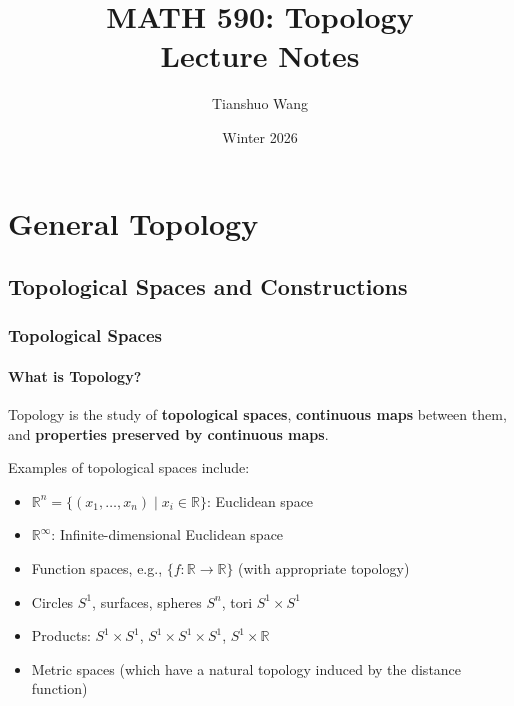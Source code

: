 \documentclass[11pt]{report}
\title{\textbf{MATH 590: Topology} \\ \large Lecture Notes}
\author{Tianshuo Wang}
\date{Winter 2026}
\begin{document}
\maketitle

\begin{center}
\end{center}

\tableofcontents
\newpage

\part{General Topology}

\chapter{Topological Spaces and Constructions}

\section{Topological Spaces}

\subsection{What is Topology?}

Topology is the study of \textbf{topological spaces}, \textbf{continuous maps} between them, and \textbf{properties preserved by continuous maps}.

\begin{exbox}
Examples of topological spaces include:
\begin{itemize}
    \item $\mathbb{R}^n = \{(x_1, \ldots, x_n) \mid x_i \in \mathbb{R}\}$: Euclidean space
    \item $\mathbb{R}^\infty$: Infinite-dimensional Euclidean space
    \item Function spaces, e.g., $\{f : \mathbb{R} \to \mathbb{R}\}$ (with appropriate topology)
    \item Circles $S^1$, surfaces, spheres $S^n$, tori $S^1 \times S^1$
    \item Products: $S^1 \times S^1$, $S^1 \times S^1 \times S^1$, $S^1 \times \mathbb{R}$
    \item Metric spaces (which have a natural topology induced by the distance function)
\end{itemize}
\end{exbox}
\end{document}
